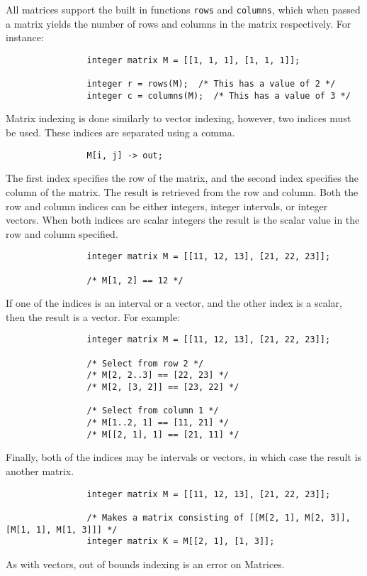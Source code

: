 \documentclass[../../gazprea.tex]{subfiles}
\begin{document}
			All matrices support the built in functions \texttt{rows} and \texttt{columns}, which when passed a matrix
			yields the number of rows and columns in the matrix respectively. For instance:

			\begin{lstlisting}
				integer matrix M = [[1, 1, 1], [1, 1, 1]];

				integer r = rows(M);  /* This has a value of 2 */
				integer c = columns(M);  /* This has a value of 3 */
			\end{lstlisting}

			Matrix indexing is done similarly to vector indexing, however, two indices must be used. These indices are
			separated using a comma.

			\begin{lstlisting}
				M[i, j] -> out;
			\end{lstlisting}

			The first index specifies the row of the matrix, and the second index specifies the column of the matrix.
			The result is retrieved from the row and column.  Both the row and column indices can be either integers,
			integer intervals, or integer vectors.  When both indices are scalar integers the result is the scalar value
			in the row and column specified.

			\begin{lstlisting}
				integer matrix M = [[11, 12, 13], [21, 22, 23]];

				/* M[1, 2] == 12 */
			\end{lstlisting}

			If one of the indices is an interval or a vector, and the other index is a scalar, then the result is a
			vector. For example:

			\begin{lstlisting}
				integer matrix M = [[11, 12, 13], [21, 22, 23]];

				/* Select from row 2 */
				/* M[2, 2..3] == [22, 23] */
				/* M[2, [3, 2]] == [23, 22] */

				/* Select from column 1 */
				/* M[1..2, 1] == [11, 21] */
				/* M[[2, 1], 1] == [21, 11] */
			\end{lstlisting}

			Finally, both of the indices may be intervals or vectors, in which case the result is another matrix.

			\begin{lstlisting}
				integer matrix M = [[11, 12, 13], [21, 22, 23]];

				/* Makes a matrix consisting of [[M[2, 1], M[2, 3]], [M[1, 1], M[1, 3]]] */
				integer matrix K = M[[2, 1], [1, 3]];
			\end{lstlisting}

			As with vectors, out of bounds indexing is an error on Matrices.
\end{document}
